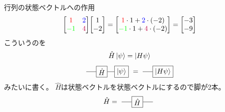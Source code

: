 \documentclass[dvipdfm]{beamer}
\begin{document}
\begin{frame}{行列の状態ベクトルへの作用}
    \begin{equation*}
        \mqty[\red{1} & \blue{2} \\ \green{-1} & \purple{4}]
        \mqty[1 \\ -2]
        =
        \mqty[
            \red{1}\cdot1+\blue{2}\cdot(-2)
            \\
            \green{-1}\cdot1+\purple{4}\cdot(-2)
        ]
        =
        \mqty[-3\\-9]
    \end{equation*}
    こういうのを
    \begin{equation*}
        \hat{H}\ket{\psi}
        =
        \ket{H\psi}
    \end{equation*}
    \begin{equation*}
        \vcenter{\hbox{
            \begin{tikzpicture}
                \node at(0,0)[draw, rectangle](H){$\hat{H}$};
                \node at(1,0)[draw, rectangle](psi){$\ket{\psi}$};
                \draw(H.east)--(psi.west)(H.west)--++(-.5,0);
            \end{tikzpicture}
        }}
        =
        \vcenter{\hbox{
            \begin{tikzpicture}
                \node at(1,0)[draw, rectangle](psi){$\ket{H\psi}$};
                \draw(psi.west)--++(-.5,0);
            \end{tikzpicture}
        }}
    \end{equation*}
    みたいに書く。
    $\hat{H}$は状態ベクトルを状態ベクトルにするので脚が2本。
    \begin{equation*}
        \hat{H}
        =
        \vcenter{\hbox{
            \begin{tikzpicture}
                \node at(0,0)[draw,rectangle](H){$\hat{H}$};
                \draw(H.east)--++(.5,0);
                \draw(H.west)--++(-.5,0);
            \end{tikzpicture}
        }}
    \end{equation*}
\end{frame}
\end{document}
